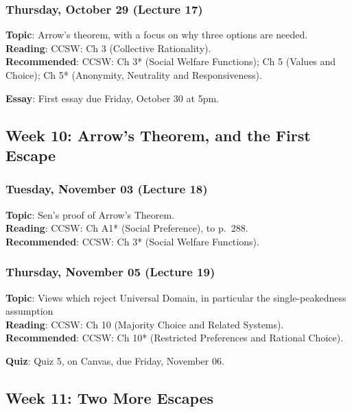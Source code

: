 \documentclass[
  letterpaper,
  DIV=11,
  numbers=noendperiod]{scrartcl}
\begin{document}
\subsubsection{Thursday, October 29 (Lecture
17)}\label{thursday-october-29-lecture-17}

\textbf{Topic}: Arrow's theorem, with a focus on why three options are
needed.\\
\textbf{Reading}: CCSW: Ch 3 (Collective Rationality).\\
\textbf{Recommended}: CCSW: Ch 3* (Social Welfare Functions); Ch 5
(Values and Choice); Ch 5* (Anonymity, Neutrality and Responsiveness).

\textbf{Essay}: First essay due Friday, October 30 at 5pm.

\subsection{Week 10: Arrow's Theorem, and the First
Escape}\label{week-10-arrows-theorem-and-the-first-escape}

\subsubsection{Tuesday, November 03 (Lecture
18)}\label{tuesday-november-03-lecture-18}

\textbf{Topic}: Sen's proof of Arrow's Theorem.\\
\textbf{Reading}: CCSW: Ch A1* (Social Preference), to p.~288.\\
\textbf{Recommended}: CCSW: Ch 3* (Social Welfare Functions).

\subsubsection{Thursday, November 05 (Lecture
19)}\label{thursday-november-05-lecture-19}

\textbf{Topic}: Views which reject Universal Domain, in particular the
single-peakedness assumption\\
\textbf{Reading}: CCSW: Ch 10 (Majority Choice and Related Systems).\\
\textbf{Recommended}: CCSW: Ch 10* (Restricted Preferences and Rational
Choice).

\textbf{Quiz}: Quiz 5, on Canvas, due Friday, November 06.

\subsection{Week 11: Two More Escapes}\label{week-11-two-more-escapes}
\end{document}
